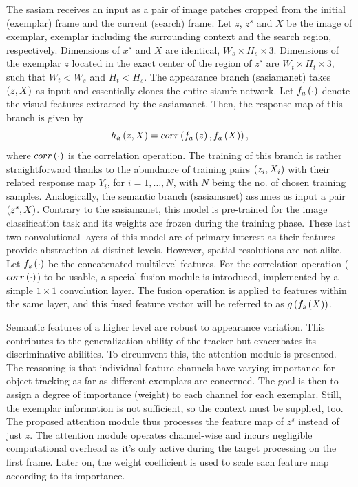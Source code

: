 The \gls{sasiam} receives an input as a pair of image patches cropped from the initial (exemplar) frame and the current (search) frame. Let $z$, $z^s$ and $X$ be the image of exemplar, exemplar including the surrounding context and the search region, respectively. Dimensions of $x^s$ and $X$ are identical, $W_s \times H_s \times 3$. Dimensions of the exemplar $z$ located in the exact center of the region of $z^s$ are $W_t \times H_t \times 3$, such that $W_t < W_s$ and $H_t < H_s$. The appearance branch (\gls{sasiamanet}) takes $\left( {z, X} \right)$ as input and essentially clones the entire \gls{siamfc} network. Let ${f_a} \left( \cdot \right)$ denote the visual features extracted by the \gls{sasiamanet}. Then, the response map of this branch is given by
\begin{equation}
    \label{eq:SiameseCrossCorrelation}
    {h_a} \left( z, X \right) = {corr} \left( {f_a} \left( z \right), {f_a} \left( X \right) \right),
\end{equation}
where ${corr} \left( \cdot \right)$ is the correlation operation. The training of this branch is rather straightforward thanks to the abundance of training pairs $\left( {z_i, X_i} \right)$ with their related response map $Y_i$, for $i = 1, \dots, N$, with $N$ being the no. of chosen training samples. Analogically, the semantic branch (\gls{sasiamsnet}) assumes as input a pair $\left( {z^s, X} \right)$. Contrary to the \gls{sasiamanet}, this model is pre-trained for the image classification task and its weights are frozen during the training phase. These last two convolutional layers of this model are of primary interest as their features provide abstraction at distinct levels. However, spatial resolutions are not alike. Let ${f_s} \left( \cdot \right)$ be the concatenated multilevel features. For the correlation operation (${corr} \left( \cdot \right)$) to be usable, a special fusion module is introduced, implemented by a simple $1 \times 1$ convolution layer. The fusion operation is applied to features within the same layer, and this fused feature vector will be referred to as ${g} \left( {f_s} \left( X \right) \right)$.

Semantic features of a higher level are robust to appearance variation. This contributes to the generalization ability of the tracker but exacerbates its discriminative abilities. To circumvent this, the attention module is presented. The reasoning is that individual feature channels have varying importance for object tracking as far as different exemplars are concerned. The goal is then to assign a degree of importance (weight) to each channel for each exemplar. Still, the exemplar information is not sufficient, so the context must be supplied, too. The proposed attention module thus processes the feature map of $z^s$ instead of just $z$. The attention module operates channel-wise and incurs negligible computational overhead as it's only active during the target processing on the first frame. Later on, the weight coefficient is used to scale each feature map according to its importance.

